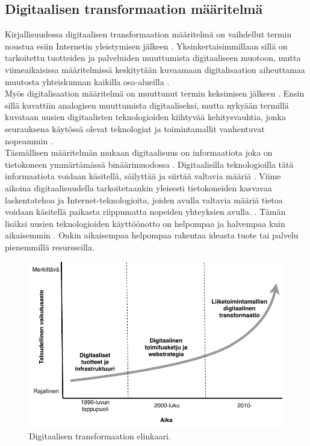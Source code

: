 \documentclass[finnish,12pt,a4paper,pdftex]{article}
\begin{document}
\subsection{Digitaalisen transformaation määritelmä}

Kirjallisuudessa digitaalisen transformaation määritelmä on vaihdellut termin noustua esiin Internetin yleistymisen jälkeen \citep{knobel}. Yksinkertaisimmillaan sillä on tarkoitettu tuotteiden ja palveluiden muuttumista digitaaliseen muotoon, mutta viimeaikaisissa määritelmissä keskitytään kuvaamaan digitalisaation aiheuttamaa muutosta yhteiskunnan kaikilla osa-alueilla \citep{lamoureux}.\\

Myös digitalisaation määritelmä on muuttunut termin keksimisen jälkeen \citep{knobel}. Ensin sillä kuvattiin analogisen muuttumista digitaaliseksi, mutta nykyään termillä kuvataan uusien digitaalisten teknologioiden kiihtyvää kehitysvauhtia, jonka seurauksena käytössä olevat teknologiat ja toimintamallit vanhentuvat nopeammin \citep{lamoureux}. \\

\noindent Täsmällisen määritelmän mukaan digitaalisuus on informaatiota joka on tietokoneen ymmärtämässä binäärimuodossa \citep{lamoureux}. Digitaalisilla teknologioilla tätä informaatiota voidaan käsitellä, säilyttää ja siirtää valtavia määriä \citep{knobel}. Viime aikoina digitaalisuudella tarkoitetaankin yleisesti tietokoneiden kasvavaa laskentatehoa ja Internet-teknologioita, joiden avulla valtavia määriä tietoa voidaan käsitellä paikasta riippumatta nopeiden yhteyksien avulla. \citep{lamoureux}. Tämän lisäksi uusien teknologioiden käyttöönotto on helpompaa ja halvempaa kuin aikaisemmin \citep{susanmoore}. Onkin aikaisempaa helpompaa rakentaa ideasta tuote tai palvelu pienemmillä resursseilla. \\

\begin{figure}[!h]
    \centering
    \includegraphics[scale=0.6]{images/digitaalinentransformaatio.pdf}
    \caption{Digitaalisen transformaation elinkaari. \citep{ibmtrans}}
    \label{fig:digivisio}
\end{figure}
\end{document}
